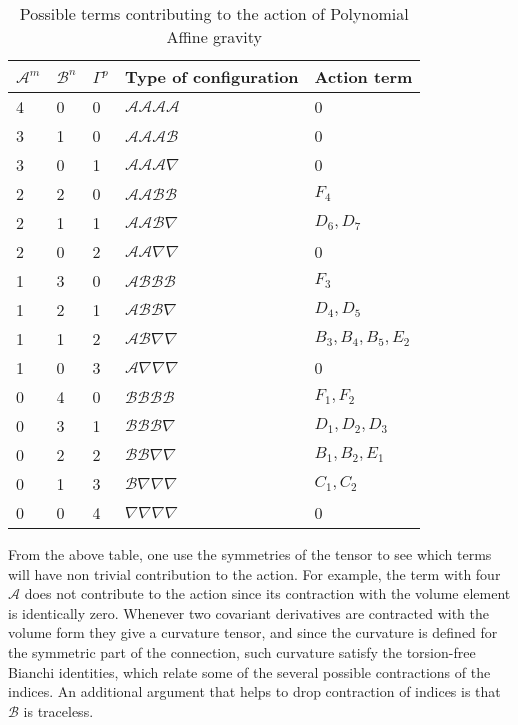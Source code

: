 \documentclass[10pt,a4paper]{article}
\begin{document}
\begin{table}[h]
\begin{center}
  \begin{tabular}{ | p{1cm} | p{1cm} | p{1cm} | p{3.5cm} | p{2cm} |}
  \hline
  $\mathcal{A}^m$ & $\mathcal{B}^n$ & $\Gamma^p$ & Type of configuration & Action term\\ \hline
  4 & 0 & 0 & $\mathcal{A}\mathcal{A}\mathcal{A}\mathcal{A}$ & 0 \\
  3 & 1 & 0 & $\mathcal{A}\mathcal{A}\mathcal{A}\mathcal{B}$ & 0 \\
  3 & 0 & 1 & $\mathcal{A}\mathcal{A}\mathcal{A}\nabla$ & 0  \\
  2 & 2 & 0 & $\mathcal{A}\mathcal{A}\mathcal{B}\mathcal{B}$ & $F_4$ \\
  2 & 1 & 1 & $\mathcal{A}\mathcal{A}\mathcal{B}\nabla$ & $D_6,D_7$ \\
  2 & 0 & 2 & $\mathcal{A}\mathcal{A}\nabla\nabla $ & 0    \\
  1 & 3 & 0 & $\mathcal{A}\mathcal{B}\mathcal{B}\mathcal{B}$ & $F_3$ \\
  1 & 2 & 1 & $\mathcal{A}\mathcal{B}\mathcal{B}\nabla$ & $D_4,D_5$ \\
  1 & 1 & 2 & $\mathcal{A}\mathcal{B}\nabla\nabla$ & $ B_3,B_4,B_5,E_2$\\
  1 & 0 & 3 & $\mathcal{A}\nabla\nabla\nabla$ & 0  \\
  0 & 4 & 0 & $\mathcal{B}\mathcal{B}\mathcal{B}\mathcal{B}$ & $F_1,F_2$ \\
  0 & 3 & 1 & $\mathcal{B}\mathcal{B}\mathcal{B}\nabla$ & $D_1,D_2,D_3$\\
  0 & 2 & 2 & $\mathcal{B}\mathcal{B}\nabla\nabla$ & $B_1,B_2,E_1$ \\
  0 & 1 & 3 & $\mathcal{B}\nabla\nabla\nabla$ & $C_1,C_2$ \\
  0 & 0 & 4 & $\nabla\nabla\nabla\nabla$ & 0\\ \hline
  \end{tabular}
  \caption{Possible terms contributing to the action of Polynomial Affine gravity}
\end{center}
\end{table}

From the above table, one use the symmetries of the tensor to see which terms will have non trivial contribution to the action. For example, the term with
four $\mathcal{A}$ does not contribute to the action since its contraction with the volume element is identically zero. Whenever two covariant
derivatives are contracted with the volume form they give a curvature tensor, and since the curvature is defined for the symmetric part of the connection, such 
curvature satisfy the torsion-free Bianchi identities, which relate some of the several possible contractions of the indices. An  additional argument that 
helps to drop contraction of indices is that $\mathcal{B}$ is traceless.
\end{document}
